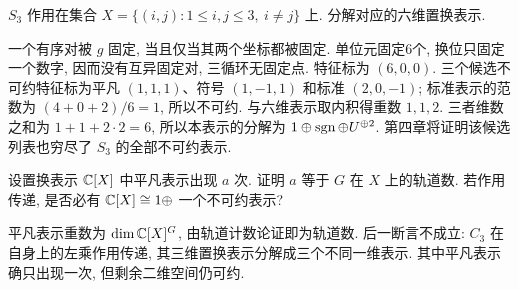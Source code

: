 \begin{example}
$S_3$ 作用在集合 $X=\{(i,j):1\le i,j\le3,\ i\ne j\}$ 上. 分解对应的六维置换表示.
\end{example}
\begin{solution}
一个有序对被 $g$ 固定, 当且仅当其两个坐标都被固定. 单位元固定6个, 换位只固定一个数字, 因而没有互异固定对, 三循环无固定点. 特征标为 $(6,0,0)$. 三个候选不可约特征标为平凡 $(1,1,1)$、符号 $(1,-1,1)$ 和标准 $(2,0,-1)$; 标准表示的范数为 $(4+0+2)/6=1$, 所以不可约. 与六维表示取内积得重数 $1,1,2$. 三者维数之和为 $1+1+2\cdot2=6$, 所以本表示的分解为 $1\oplus\operatorname{sgn}\oplus U^{\oplus2}$. 第四章将证明该候选列表也穷尽了 $S_3$ 的全部不可约表示.
\end{solution}

\begin{exercise}
设置换表示 $\mathbb C[X]$ 中平凡表示出现 $a$ 次. 证明 $a$ 等于 $G$ 在 $X$ 上的轨道数. 若作用传递, 是否必有 $\mathbb C[X]\cong1\oplus$ 一个不可约表示?
\end{exercise}
\begin{solution}
平凡表示重数为 $\dim\mathbb C[X]^G$, 由轨道计数论证即为轨道数. 后一断言不成立: $C_3$ 在自身上的左乘作用传递, 其三维置换表示分解成三个不同一维表示. 其中平凡表示确只出现一次, 但剩余二维空间仍可约.
\end{solution}
